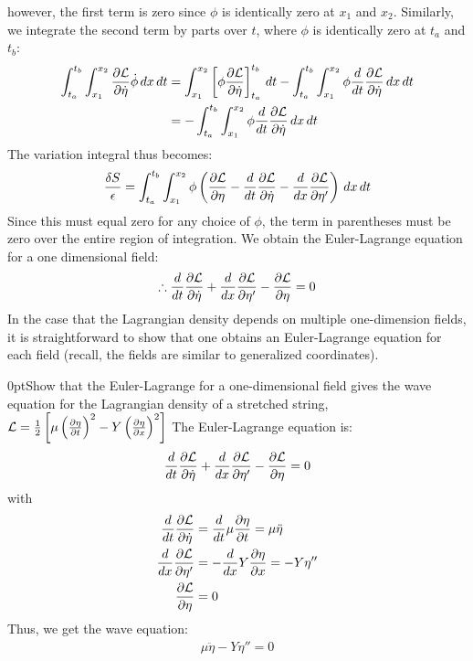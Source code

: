 however, the first term is zero since $\phi$ is identically zero at $x_1$ and $x_2$. Similarly, we integrate the second term by parts over $t$, where $\phi$ is identically zero at $t_a$ and $t_b$:
\begin{align}
\int_{t_a}^{t_b} \int_{x_1}^{x_2}\frac{\partial \mathcal{L}}{\partial \dot\eta}\dot\phi \,dx\,dt&=\int_{x_1}^{x_2}\left[\phi\frac{\partial \mathcal{L}}{\partial \dot\eta}\right]_{t_a}^{t_b}\,dt-\int_{t_a}^{t_b} \int_{x_1}^{x_2}\phi\frac{d}{dt}\frac{\partial \mathcal{L}}{\partial \dot\eta} \,dx\,dt\nonumber\\
&=-\int_{t_a}^{t_b} \int_{x_1}^{x_2}\phi\frac{d}{dt}\frac{\partial \mathcal{L}}{\partial \dot\eta} \,dx\,dt
\end{align}
The variation integral thus becomes:
\begin{align}
\frac{\delta S}{\epsilon}=\int_{t_a}^{t_b} \int_{x_1}^{x_2} \phi \left(\frac{\partial \mathcal{L}}{\partial \eta}-\frac{d}{dt}\frac{\partial \mathcal{L}}{\partial \dot\eta}- \frac{d}{dx}\frac{\partial \mathcal{L}}{\partial \eta'} \right)\,dx\,dt
\end{align}
Since this must equal zero for any choice of $\phi$, the term in parentheses must be zero over the entire region of integration. We obtain the Euler-Lagrange equation for a one dimensional field:
\begin{align}
\therefore \frac{d}{dt}\frac{\partial \mathcal{L}}{\partial \dot\eta}+\frac{d}{dx}\frac{\partial \mathcal{L}}{\partial \eta'}-\frac{\partial \mathcal{L}}{\partial \eta}=0
\end{align}
In the case that the Lagrangian density depends on multiple one-dimension fields, it is straightforward to show that one obtains an Euler-Lagrange equation for each field (recall, the fields are similar to generalized coordinates). 

\begin{example}{0pt}{Show that the Euler-Lagrange for a one-dimensional field gives the wave equation for the Lagrangian density of a stretched string, $\mathcal{L}=\frac{1}{2}\left[\mu\left(\frac{\partial\eta}{\partial t}\right)^2-Y\left(\frac{\partial\eta}{\partial x}\right)^2\right]$}{}
The Euler-Lagrange equation is:
\begin{align*}
\frac{d}{dt}\frac{\partial \mathcal{L}}{\partial \dot\eta}+\frac{d}{dx}\frac{\partial \mathcal{L}}{\partial \eta'}-\frac{\partial \mathcal{L}}{\partial \eta}=0
\end{align*}
with
\begin{align*}
\frac{d}{dt}\frac{\partial \mathcal{L}}{\partial \dot\eta}&=\frac{d}{dt}\mu\frac{\partial\eta}{\partial t}=\mu\ddot\eta\\
\frac{d}{dx}\frac{\partial \mathcal{L}}{\partial \eta'}&=-\frac{d}{dx}Y\frac{\partial\eta}{\partial x}=-Y\eta''\\
\frac{\partial \mathcal{L}}{\partial \eta}&=0
\end{align*}
Thus, we get the wave equation:
\begin{align*}
\mu\ddot\eta-Y\eta''=0
\end{align*}
\end{example}


